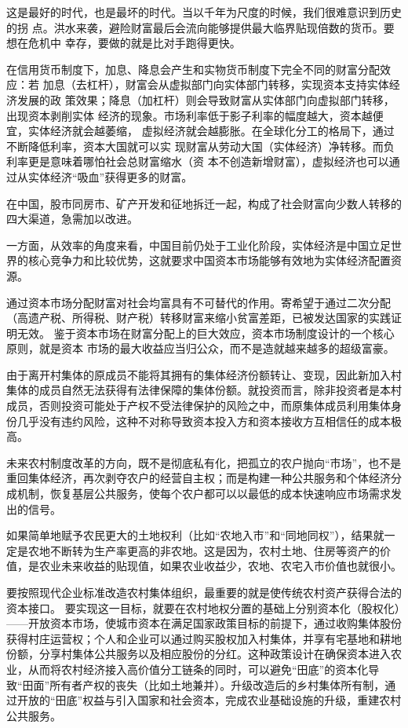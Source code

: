 这是最好的时代，也是最坏的时代。当以千年为尺度的时候，我们很难意识到历史的拐
点。洪水来袭，避险财富最后会流向能够提供最大临界贴现倍数的货币。要想在危机中
幸存，要做的就是比对手跑得更快。

在信用货币制度下，加息、降息会产生和实物货币制度下完全不同的财富分配效应：若
加息（去杠杆），财富会从虚拟部门向实体部门转移，实现资本支持实体经济发展的政
策效果；降息（加杠杆）则会导致财富从实体部门向虚拟部门转移，出现资本剥削实体
经济的现象。市场利率低于影子利率的幅度越大，资本越便宜，实体经济就会越萎缩，
虚拟经济就会越膨胀。在全球化分工的格局下，通过不断降低利率，资本大国就可以实
现财富从劳动大国（实体经济）净转移。而负利率更是意味着哪怕社会总财富缩水（资
本不创造新增财富），虚拟经济也可以通过从实体经济“吸血”获得更多的财富。

在中国，股市同房市、矿产开发和征地拆迁一起，构成了社会财富向少数人转移的四大渠道，急需加以改进。

一方面，从效率的角度来看，中国目前仍处于工业化阶段，实体经济是中国立足世界的核心竞争力和比较优势，这就要求中国资本市场能够有效地为实体经济配置资源。

通过资本市场分配财富对社会均富具有不可替代的作用。寄希望于通过二次分配（高遗产税、所得税、财产税）转移财富来缩小贫富差距，已被发达国家的实践证明无效。
鉴于资本市场在财富分配上的巨大效应，资本市场制度设计的一个核心原则，就是资本
市场的最大收益应当归公众，而不是造就越来越多的超级富豪。

由于离开村集体的原成员不能将其拥有的集体经济份额转让、变现，因此新加入村集体的成员自然无法获得有法律保障的集体份额。就投资而言，除非投资者是本村成员，否则投资可能处于产权不受法律保护的风险之中，而原集体成员利用集体身份几乎没有违约风险，这种不对称导致资本投入方和资本接收方互相信任的成本极高。

未来农村制度改革的方向，既不是彻底私有化，把孤立的农户抛向“市场”，也不是重回集体经济，再次剥夺农户的经营自主权；而是构建一种公共服务和个体经济分成机制，恢复基层公共服务，使每个农户都可以以最低的成本快速响应市场需求发出的信号。

如果简单地赋予农民更大的土地权利（比如“农地入市”和“同地同权”），结果就一定是农地不断转为生产率更高的非农地。这是因为，农村土地、住房等资产的价值，是农业未来收益的贴现值，如果农业收益少，农地、农宅入市价值也就很小。

要按照现代企业标准改造农村集体组织，最重要的就是使传统农村资产获得合法的资本接口。
要实现这一目标，就要在农村地权分置的基础上分别资本化（股权化）——开放资本市场，使城市资本在满足国家政策目标的前提下，通过收购集体股份获得村庄运营权；个人和企业可以通过购买股权加入村集体，并享有宅基地和耕地份额，分享村集体公共服务以及相应股份的分红。这种政策设计在确保资本进入农业，从而将农村经济接入高价值分工链条的同时，可以避免“田底”的资本化导致“田面”所有者产权的丧失（比如土地兼并）。升级改造后的乡村集体所有制，通过开放的“田底”权益与引入国家和社会资本，完成农业基础设施的升级，重建农村公共服务。


